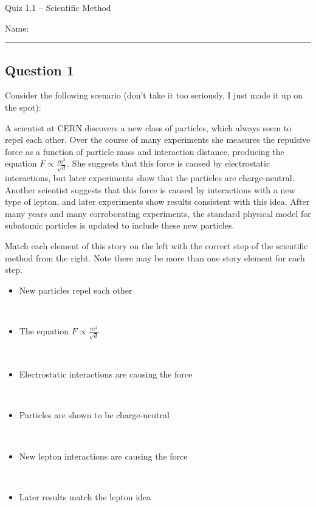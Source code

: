 \documentclass[11pt, letterpaper]{memoir}
\begin{document}
\begin{center}
	{\large	Quiz 1.1 -- Scientific Method}
\end{center}
{\large Name: \rule[-1mm]{4in}{.1pt}
\subsection*{Question 1}
Consider the following scenario (don't take it too seriously, I just made it up on the spot):

A scientist at CERN discovers a new class of particles, which always seem to repel each other. Over the course of many experiments she measures the repulsive force as a function of particle mass and interaction distance, producing the equation $F\propto\frac{m^2}{\sqrt{d}}$. She suggests that this force is caused by electrostatic interactions, but later experiments show that the particles are charge-neutral. Another scientist suggests that this force is caused by interactions with a new type of lepton, and later experiments show results consistent with this idea. After many years and many corroborating experiments, the standard physical model for subatomic particles is updated to include these new particles.

Match each element of this story on the left with the correct step of the scientific method from the right. Note there may be more than one story element for each step.

\noindent
\begin{minipage}{0.65\textwidth}
	\vspace{0.8em}
	\begin{itemize}
		\item New particles repel each other

		      ~

		\item The equation $F\propto\frac{m^2}{\sqrt{d}}$

		      ~

		\item Electrostatic interactions are causing the force

		      ~

		\item Particles are shown to be charge-neutral

		      ~

		\item New lepton interactions are causing the force

		      ~

		\item Later results match the lepton idea


\end{itemize}
\end{minipage}}
\end{document}
